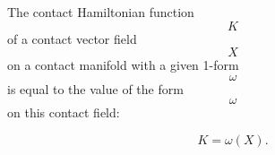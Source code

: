 The contact Hamiltonian function $$K$$ of a contact vector field $$X$$ on a contact manifold with a given 1-form $$\omega$$ is equal to the value of the form $$\omega$$ on this contact field:

$$K = \omega(X).$$
